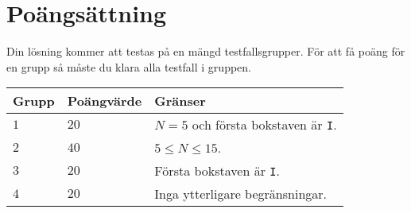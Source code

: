 \section*{Poängsättning}
Din lösning kommer att testas på en mängd testfallsgrupper.
För att få poäng för en grupp så måste du klara alla testfall i gruppen.
\noindent
\begin{tabular}{| l | l | l |}
\hline
  Grupp & Poängvärde & Gränser \\ \hline
  $1$    & $20$       &  $N=5$ och första bokstaven är \texttt{I}.\\ \hline 
  $2$    & $40$       &  $5\le N\le 15$. \\ \hline 
  $3$    & $20$       &  Första bokstaven är \texttt{I}.\\ \hline 
  $4$    & $20$       &  Inga ytterligare begränsningar. \\ \hline
\end{tabular}
